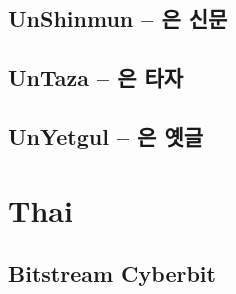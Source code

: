 \documentclass[12pt]{scrartcl}
\begin{document}
\begin{CJK}{UTF8}{song}
\subsection{UnShinmun -- 은 신문}
\testKR

\subsection{UnTaza -- 은 타자}
\testKR

\subsection{UnYetgul -- 은 옛글}
\testKR


\section{Thai}


\CJKfamily{}
\subsection{Bitstream Cyberbit}
\testTH


\end{CJK}
\end{document}
